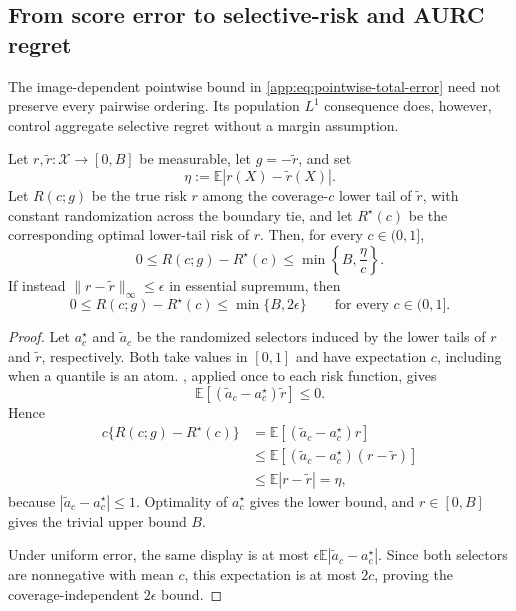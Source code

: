 \subsection{From score error to selective-risk and AURC regret}

The image-dependent pointwise bound in
\cref{app:eq:pointwise-total-error} need not preserve every pairwise ordering.
Its population $L^1$ consequence does, however, control aggregate selective
regret without a margin assumption.

\begin{proposition}
\label{app:prop:aurc-regret}
Let $r,\widetilde r:\mathcal X\to[0,B]$ be measurable, let
$g=-\widetilde r$, and set
\begin{equation*}
  \eta:=\mathbb E|r(X)-\widetilde r(X)|.
\end{equation*}
Let $R(c;g)$ be the true risk $r$ among the coverage-$c$ lower tail of
$\widetilde r$, with constant randomization across the boundary tie, and let
$R^\star(c)$ be the corresponding optimal lower-tail risk of $r$. Then, for
every $c\in(0,1]$,
\begin{equation*}
  0\leq R(c;g)-R^\star(c)
  \leq\min\!\left\{B,\frac{\eta}{c}\right\}.
\end{equation*}
If instead $\|r-\widetilde r\|_\infty\leq\epsilon$ in essential supremum, then
\begin{equation*}
  0\leq R(c;g)-R^\star(c)\leq\min\{B,2\epsilon\}
  \qquad\text{for every }c\in(0,1].
\end{equation*}
\end{proposition}

\begin{proof}
Let $a_c^\star$ and $\widetilde a_c$ be the randomized selectors induced by
the lower tails of $r$ and $\widetilde r$, respectively. Both take values in
$[0,1]$ and have expectation $c$, including when a quantile is an atom.
, applied once to each risk
function, gives
\begin{equation*}
  \mathbb E[(\widetilde a_c-a_c^\star)\widetilde r]\leq0.
\end{equation*}
Hence
\begin{align*}
  c\{R(c;g)-R^\star(c)\}
  &=\mathbb E[(\widetilde a_c-a_c^\star)r]\\
  &\leq
    \mathbb E[(\widetilde a_c-a_c^\star)(r-\widetilde r)]\\
  &\leq\mathbb E|r-\widetilde r|=\eta,
\end{align*}
because $|\widetilde a_c-a_c^\star|\leq1$. Optimality of $a_c^\star$ gives
the lower bound, and $r\in[0,B]$ gives the trivial upper bound $B$.

Under uniform error, the same display is at most
$\epsilon\mathbb E|\widetilde a_c-a_c^\star|$. Since both selectors are
nonnegative with mean $c$, this expectation is at most $2c$, proving the
coverage-independent $2\epsilon$ bound.
\end{proof}


